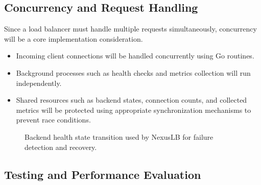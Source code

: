 \documentclass[11pt,a4paper]{article}
\begin{document}
\subsection{Concurrency and Request Handling}

Since a load balancer must handle multiple requests simultaneously, concurrency will be a core implementation consideration.

\begin{itemize}
    \item Incoming client connections will be handled concurrently using Go routines.

    \item Background processes such as health checks and metrics collection will run independently.

    \item Shared resources such as backend states, connection counts, and collected metrics will be protected using appropriate synchronization mechanisms to prevent race conditions.
\end{itemize}

\begin{figure}[ht]
\centering


\caption{Backend health state transition used by NexusLB for failure detection and recovery.}

\label{fig:backend_health_state}

\end{figure}

\subsection{Testing and Performance Evaluation}
\end{document}
